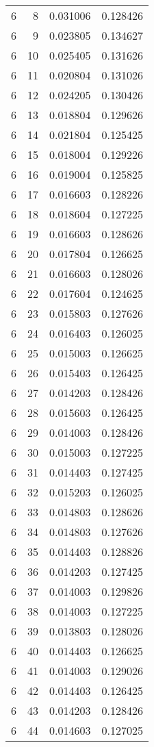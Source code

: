 \begin{longtable}{rrrr}
6 & 8 & 0.031006 & 0.128426 \\
6 & 9 & 0.023805 & 0.134627 \\
6 & 10 & 0.025405 & 0.131626 \\
6 & 11 & 0.020804 & 0.131026 \\
6 & 12 & 0.024205 & 0.130426 \\
6 & 13 & 0.018804 & 0.129626 \\
6 & 14 & 0.021804 & 0.125425 \\
6 & 15 & 0.018004 & 0.129226 \\
6 & 16 & 0.019004 & 0.125825 \\
6 & 17 & 0.016603 & 0.128226 \\
6 & 18 & 0.018604 & 0.127225 \\
6 & 19 & 0.016603 & 0.128626 \\
6 & 20 & 0.017804 & 0.126625 \\
6 & 21 & 0.016603 & 0.128026 \\
6 & 22 & 0.017604 & 0.124625 \\
6 & 23 & 0.015803 & 0.127626 \\
6 & 24 & 0.016403 & 0.126025 \\
6 & 25 & 0.015003 & 0.126625 \\
6 & 26 & 0.015403 & 0.126425 \\
6 & 27 & 0.014203 & 0.128426 \\
6 & 28 & 0.015603 & 0.126425 \\
6 & 29 & 0.014003 & 0.128426 \\
6 & 30 & 0.015003 & 0.127225 \\
6 & 31 & 0.014403 & 0.127425 \\
6 & 32 & 0.015203 & 0.126025 \\
6 & 33 & 0.014803 & 0.128626 \\
6 & 34 & 0.014803 & 0.127626 \\
6 & 35 & 0.014403 & 0.128826 \\
6 & 36 & 0.014203 & 0.127425 \\
6 & 37 & 0.014003 & 0.129826 \\
6 & 38 & 0.014003 & 0.127225 \\
6 & 39 & 0.013803 & 0.128026 \\
6 & 40 & 0.014403 & 0.126625 \\
6 & 41 & 0.014003 & 0.129026 \\
6 & 42 & 0.014403 & 0.126425 \\
6 & 43 & 0.014203 & 0.128426 \\
6 & 44 & 0.014603 & 0.127025 \\

\end{longtable}
